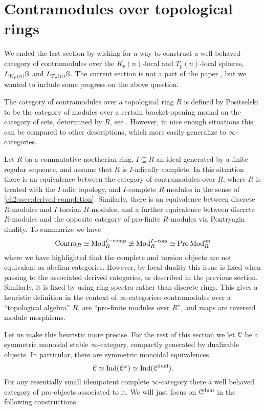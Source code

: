 
\section{Contramodules over topological rings}
\label{ch2:addendum}

We ended the last section by wishing for a way to construct a well behaved category of contramodules over the $K_p(n)$-local and $T_p(n)$-local spheres, $L_\Kpn\S$ and $L_{T_p(n)}\S$. The current section is not a part of the paper \cite{aambo_2024_positselski}, but we wanted to include some progress on the above question. 

The category of contramodules over a topological ring $R$ is defined by Positselski to be the category of modules over a certain bracket-opening monad on the category of sets, determined by $R$, see \cite{positselski_2022_contramodules}. However, in nice enough situations this can be compared to other descriptions, which more easily generalize to $\infty$-categories. 

\begin{remark}
    \label{ch2:rm:contra-as-op-pro-modules}
    Let $R$ ba a commutative noetherian ring, $I\subseteq R$ an ideal generated by a finite regular sequence, and assume that $R$ is $I$-adically complete. In this situation there is an equivalence between the category of contramodules over $R$, where $R$ is treated with the $I$-adic topology, and $I$-complete $R$-modules in the sense of \cref{ch2:ssec:derived-completion}. Similarly, there is an equivalence between discrete $R$-modules and $I$-torsion $R$-modules, and a further equivalence between discrete $R$-modules and the opposite category of pro-finite $R$-modules via Pontryagin duality. To summarize we have  
    \[\Contra_R \simeq \Mod_R\Icomp \not\simeq \Mod_R\Itors\simeq \Pro\Mod_R\op\]
    where we have highlighted that the complete and torsion objects are not equivalent as abelian categories. However, by local duality this issue is fixed when passing to the associated derived categories, as described in the previous section. Similarly, it is fixed by using ring spectra rather than discrete rings. This gives a heuristic definition in the context of $\infty$-categories: contramodules over a ``topological algebra'' $R$, are ``pro-finite modules over $R$'', and maps are reversed module morphisms.  
\end{remark}

Let us make this heuristic more precise. For the rest of this section we let $\C$ be a symmetric monoidal stable $\infty$-category, compactly generated by dualizable objects. In particular, there are symmetric monoidal equivalences 
\[\C \simeq \Ind(\C^\omega) \simeq \Ind(\C\dual).\]
For any essentially small idempotent complete $\infty$-category there a well behaved category of pro-objects associated to it. We will just focus on $\C\dual$ in the following constructions. 


